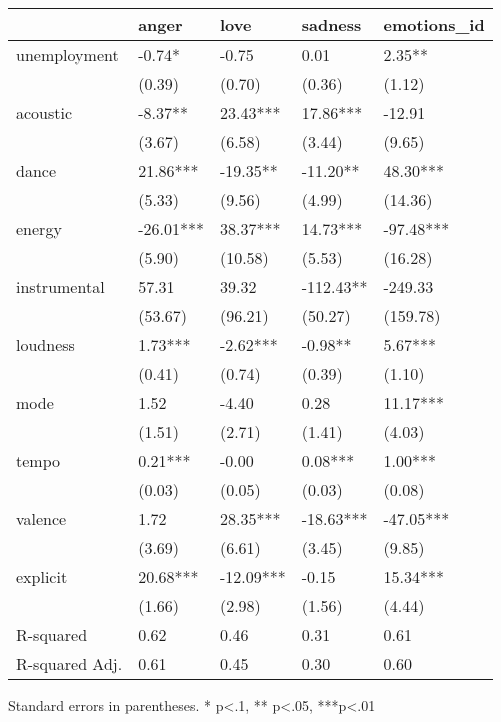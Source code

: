 \begin{table}
\caption{}
\label{}
\begin{center}
\begin{tabular}{lllll}
\hline
               & anger     & love      & sadness   & emotions\_id  \\
\hline
unemployment   & -0.74*    & -0.75     & 0.01      & 2.35**        \\
               & (0.39)    & (0.70)    & (0.36)    & (1.12)        \\
acoustic       & -8.37**   & 23.43***  & 17.86***  & -12.91        \\
               & (3.67)    & (6.58)    & (3.44)    & (9.65)        \\
dance          & 21.86***  & -19.35**  & -11.20**  & 48.30***      \\
               & (5.33)    & (9.56)    & (4.99)    & (14.36)       \\
energy         & -26.01*** & 38.37***  & 14.73***  & -97.48***     \\
               & (5.90)    & (10.58)   & (5.53)    & (16.28)       \\
instrumental   & 57.31     & 39.32     & -112.43** & -249.33       \\
               & (53.67)   & (96.21)   & (50.27)   & (159.78)      \\
loudness       & 1.73***   & -2.62***  & -0.98**   & 5.67***       \\
               & (0.41)    & (0.74)    & (0.39)    & (1.10)        \\
mode           & 1.52      & -4.40     & 0.28      & 11.17***      \\
               & (1.51)    & (2.71)    & (1.41)    & (4.03)        \\
tempo          & 0.21***   & -0.00     & 0.08***   & 1.00***       \\
               & (0.03)    & (0.05)    & (0.03)    & (0.08)        \\
valence        & 1.72      & 28.35***  & -18.63*** & -47.05***     \\
               & (3.69)    & (6.61)    & (3.45)    & (9.85)        \\
explicit       & 20.68***  & -12.09*** & -0.15     & 15.34***      \\
               & (1.66)    & (2.98)    & (1.56)    & (4.44)        \\
R-squared      & 0.62      & 0.46      & 0.31      & 0.61          \\
R-squared Adj. & 0.61      & 0.45      & 0.30      & 0.60          \\
\hline
\end{tabular}
\end{center}
\end{table}
\bigskip
Standard errors in parentheses. \newline 
* p<.1, ** p<.05, ***p<.01